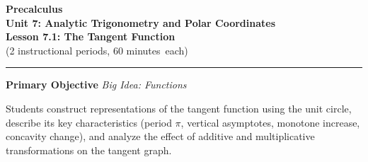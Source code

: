 \documentclass[10pt]{article}
\newcommand{\MeetingLength}{60 minutes}
\begin{document}
\begin{center}
  {\Large\bfseries\color{navy} Precalculus}\\[4pt]
  {\large\bfseries Unit 7: Analytic Trigonometry and Polar Coordinates}\\[2pt]
  {\large\bfseries Lesson 7.1: The Tangent Function}\\[2pt]
  {\normalsize (2 instructional periods, \MeetingLength\ each)}
\end{center}

\vspace{4pt}
\hrule
\vspace{8pt}

\begin{tcolorbox}[colback=sky, colframe=navy, boxrule=0.9pt, arc=2mm,
    left=2mm, right=2mm, top=1.5mm, bottom=1.5mm]
  \textbf{Primary Objective} \hfill \textit{Big Idea: Functions}

  \medskip
  Students construct representations of the tangent function using the unit
  circle, describe its key characteristics (period $\pi$, vertical
  asymptotes, monotone increase, concavity change), and analyze the effect
  of additive and multiplicative transformations on the tangent graph.
\end{tcolorbox}

\vspace{6pt}
\end{document}
